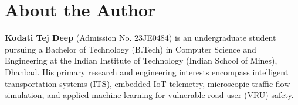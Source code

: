 \chapter*{About the Author}

\textbf{Kodati Tej Deep} (Admission No. 23JE0484) is an undergraduate student pursuing a Bachelor of Technology (B.Tech) in Computer Science and Engineering at the Indian Institute of Technology (Indian School of Mines), Dhanbad. His primary research and engineering interests encompass intelligent transportation systems (ITS), embedded IoT telemetry, microscopic traffic flow simulation, and applied machine learning for vulnerable road user (VRU) safety.
